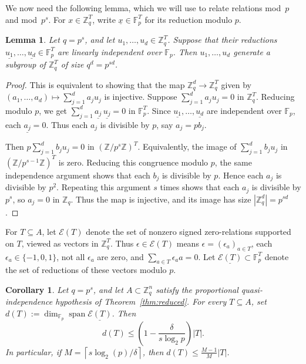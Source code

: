 \documentclass[11pt]{amsart}
\newtheorem{lemma}[theorem]{Lemma}
\newtheorem{corollary}[theorem]{Corollary}
\newcommand{\Z}{\mathbb{Z}}
\newcommand{\F}{\mathbb{F}}
\DeclareMathOperator{\Span}{span}
\begin{document}
We now need the following lemma, which we will use to relate relations mod~\(p\) and mod~\(p^s\). For \(x\in \Z_q^T\), write \(\underline{x}\in \F_p^T\) for its reduction modulo \(p\).

\begin{lemma}\label{lem:redModP}
Let \(q=p^s\), and let \(u_1,\ldots,u_d\in \Z_q^T\). Suppose that their reductions \(\underline{u_1},\ldots,\underline{u_d}\in \F_p^T\) are linearly independent over \(\F_p\). Then \(u_1,\ldots,u_d\) generate a subgroup of \(\Z_q^T\) of size \(q^d=p^{sd}\).
\end{lemma}

\begin{proof}
This is equivalent to showing that the map \(\Z_q^d\to\Z_q^T\) given by \((a_1,\ldots,a_d)\mapsto \sum_{j=1}^d a_j u_j\) is injective. Suppose \(\sum_{j=1}^d a_j u_j=0\) in \(\Z_q^T\). Reducing modulo \(p\), we get \(\sum_{j=1}^d \underline{a_j}\,\underline{u_j}=0\) in \(\F_p^T\). Since \(\underline{u_1},\ldots,\underline{u_d}\) are independent over \(\F_p\), each \(\underline{a_j}=0\). Thus each \(a_j\) is divisible by \(p\), say \(a_j=pb_j\).

Then \(p\sum_{j=1}^d b_j u_j=0\) in \((\Z/p^s\Z)^T\). Equivalently, the image of \(\sum_{j=1}^d b_j u_j\) in \((\Z/p^{s-1}\Z)^T\) is zero. Reducing this congruence modulo \(p\), the same independence argument shows that each \(b_j\) is divisible by \(p\). Hence each \(a_j\) is divisible by \(p^2\). Repeating this argument \(s\) times shows that each \(a_j\) is divisible by \(p^s\), so \(a_j=0\) in \(\Z_q\). Thus the map is injective, and its image has size \(|\Z_q^d|=p^{sd}\).
\end{proof}

For \(T\subseteq A\), let \(\mathcal E(T)\) denote the set of nonzero signed zero-relations supported on \(T\), viewed as vectors in \(\Z_q^T\). Thus \(\epsilon\in\mathcal E(T)\) means \(\epsilon=(\epsilon_a)_{a\in T}\), each \(\epsilon_a\in\{-1,0,1\}\), not all \(\epsilon_a\) are zero, and \(\sum_{a\in T}\epsilon_a a=0\). Let \(\underline{\mathcal E(T)}\subset\F_p^T\) denote the set of reductions of these vectors modulo \(p\).

\begin{corollary}\label{cor:local-dim-bound}
Let \(q=p^s\), and let \(A\subset \Z_q^n\) satisfy the proportional quasi-independence hypothesis of Theorem~\ref{thm:reduced}. For every \(T\subseteq A\), set \(d(T):=\dim_{\F_p}\Span \underline{\mathcal E(T)}\). Then
$$
        d(T)\leq \left(1-\frac{\delta}{s\log_2 p}\right)|T|.
$$
In particular, if \(M=\left\lceil s\log_2(p)/\delta\right\rceil\), then \(d(T)\leq \frac{M-1}{M}|T|\).
\end{corollary}
\end{document}
